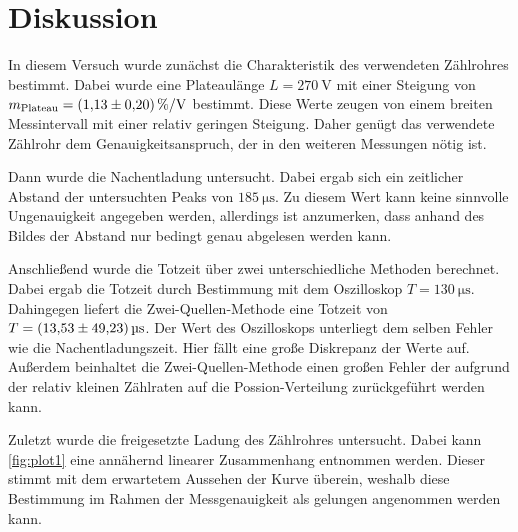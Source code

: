 \section{Diskussion}
\label{sec:Diskussion}
In diesem Versuch wurde zunächst die Charakteristik des verwendeten Zählrohres bestimmt. Dabei wurde eine Plateaulänge $L = \qty{270}{\volt}$ mit einer Steigung von 
$m_\text{Plateau} = \qty{1.13+-0.20}{\percent\per\volt}$ bestimmt. Diese Werte zeugen von einem breiten Messintervall mit einer relativ geringen Steigung. Daher genügt das verwendete 
Zählrohr dem Genauigkeitsanspruch, der in den weiteren Messungen nötig ist.

Dann wurde die Nachentladung untersucht. Dabei ergab sich ein zeitlicher Abstand der untersuchten Peaks von $\qty{185}{\micro\second}$. Zu diesem Wert kann keine sinnvolle
Ungenauigkeit angegeben werden, allerdings ist anzumerken, dass anhand des Bildes der Abstand nur bedingt genau abgelesen werden kann.  

Anschließend wurde die Totzeit über zwei unterschiedliche Methoden berechnet. Dabei ergab die Totzeit durch Bestimmung mit dem Oszilloskop $T = \qty{130}{\micro\second}$. Dahingegen
liefert die Zwei-Quellen-Methode eine Totzeit von $T = \qty{13.53 +-49.23}{\micro\second}$. Der Wert des Oszilloskops unterliegt dem selben Fehler wie die Nachentladungszeit.
Hier fällt eine große Diskrepanz der Werte auf. Außerdem beinhaltet die Zwei-Quellen-Methode einen großen Fehler der aufgrund der relativ kleinen Zählraten auf die 
Possion-Verteilung zurückgeführt werden kann.

Zuletzt wurde die freigesetzte Ladung des Zählrohres untersucht. Dabei kann \autoref{fig:plot1} eine annähernd linearer Zusammenhang entnommen werden. Dieser stimmt mit 
dem erwartetem Aussehen der Kurve überein, weshalb diese Bestimmung im Rahmen der Messgenauigkeit als gelungen angenommen werden kann.

